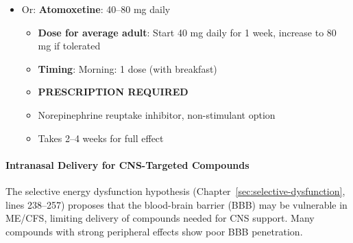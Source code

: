 \begin{enumerate}
\begin{itemize}
        \item Or: \textbf{Atomoxetine}: 40--80 mg daily
        \begin{itemize}
            \item \textbf{Dose for average adult}: Start 40 mg daily for 1 week, increase to 80 mg if tolerated
            \item \textbf{Timing}: Morning: 1 dose (with breakfast)
            \item \textbf{PRESCRIPTION REQUIRED}
            \item Norepinephrine reuptake inhibitor, non-stimulant option
            \item Takes 2--4 weeks for full effect
        \end{itemize}
    \end{itemize}
\end{enumerate}

\paragraph{Intranasal Delivery for CNS-Targeted Compounds}

\begin{keypoint}
The selective energy dysfunction hypothesis (Chapter~\ref{sec:selective-dysfunction}, lines 238--257) proposes that the blood-brain barrier (BBB) may be vulnerable in ME/CFS, limiting delivery of compounds needed for CNS support. Many compounds with strong peripheral effects show poor BBB penetration.
\end{keypoint}

